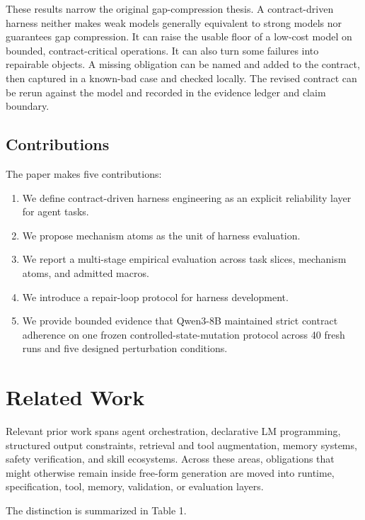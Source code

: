 \documentclass[11pt]{article}
\begin{document}
These results narrow the original gap-compression thesis. A contract-driven harness neither makes weak models generally equivalent to strong models nor guarantees gap compression. It can raise the usable floor of a low-cost model on bounded, contract-critical operations. It can also turn some failures into repairable objects. A missing obligation can be named and added to the contract, then captured in a known-bad case and checked locally. The revised contract can be rerun against the model and recorded in the evidence ledger and claim boundary.

\subsection{Contributions}

The paper makes five contributions:

\begin{enumerate}
\item We define contract-driven harness engineering as an explicit reliability layer for agent tasks.
\item We propose mechanism atoms as the unit of harness evaluation.
\item We report a multi-stage empirical evaluation across task slices, mechanism atoms, and admitted macros.
\item We introduce a repair-loop protocol for harness development.
\item We provide bounded evidence that Qwen3-8B maintained strict contract adherence on one frozen controlled-state-mutation protocol across 40 fresh runs and five designed perturbation conditions.
\end{enumerate}

\section{Related Work}

Relevant prior work spans agent orchestration, declarative LM programming, structured output constraints, retrieval and tool augmentation, memory systems, safety verification, and skill ecosystems. Across these areas, obligations that might otherwise remain inside free-form generation are moved into runtime, specification, tool, memory, validation, or evaluation layers.

The distinction is summarized in Table 1.
\end{document}
